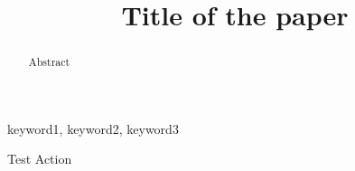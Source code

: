 \documentclass[conference]{IEEEtran}
\begin{document}
\title{Title of the paper
{\footnotesize}
}

\author{
}

\maketitle

\begin{abstract} 
Abstract 
\end{abstract}

\begin{IEEEkeywords}
keyword1, keyword2, keyword3
\end{IEEEkeywords}


Test Action


\clearpage
\end{document}
